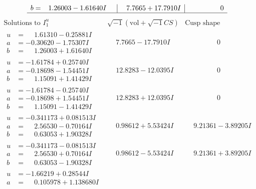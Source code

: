 \documentclass[1p]{elsarticle_modified}
\theoremstyle{definition}
\newcommand{\I}{\sqrt{-1}}
\begin{document}
$$\begin{array}{c|c|c}
\begin{aligned}
b &= \phantom{-}1.26003 - 1.61640 I\end{aligned}
 & \phantom{-}7.7665 + 17.7910 I & \phantom{-0.000000 } 0\\
 \hline 
 \end{array}$$\newpage$$\begin{array}{c|c|c}  
\text{Solutions to }I^u_{1}& \I (\text{vol} + \sqrt{-1}CS) & \text{Cusp shape}\\
 \hline 
\begin{aligned}
u &= \phantom{-}1.61310 - 0.25881 I \\
a &= -0.30620 - 1.75307 I \\
b &= \phantom{-}1.26003 + 1.61640 I\end{aligned}
 & \phantom{-}7.7665 - 17.7910 I & \phantom{-0.000000 } 0 \\ \hline\begin{aligned}
u &= -1.61784 + 0.25740 I \\
a &= -0.18698 - 1.54451 I \\
b &= \phantom{-}1.15091 + 1.41429 I\end{aligned}
 & \phantom{-}12.8283 - 12.0395 I & \phantom{-0.000000 } 0 \\ \hline\begin{aligned}
u &= -1.61784 - 0.25740 I \\
a &= -0.18698 + 1.54451 I \\
b &= \phantom{-}1.15091 - 1.41429 I\end{aligned}
 & \phantom{-}12.8283 + 12.0395 I & \phantom{-0.000000 } 0 \\ \hline\begin{aligned}
u &= -0.341173 + 0.081513 I \\
a &= \phantom{-}2.56530 - 0.70164 I \\
b &= \phantom{-}0.63053 + 1.90328 I\end{aligned}
 & \phantom{-}0.98612 + 5.53424 I & \phantom{-}9.21361 - 3.89205 I \\ \hline\begin{aligned}
u &= -0.341173 - 0.081513 I \\
a &= \phantom{-}2.56530 + 0.70164 I \\
b &= \phantom{-}0.63053 - 1.90328 I\end{aligned}
 & \phantom{-}0.98612 - 5.53424 I & \phantom{-}9.21361 + 3.89205 I \\ \hline\begin{aligned}
u &= -1.66219 + 0.28544 I \\
a &= \phantom{-}0.105978 + 1.138680 I \\

\end{aligned}
\end{array}$$
\end{document}
